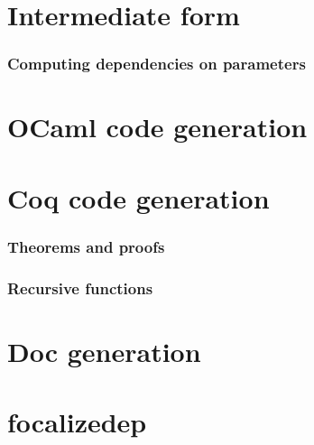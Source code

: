 \documentclass{book}
\begin{document}
\chapter{Intermediate form}
\subsection{Computing dependencies on parameters}

\chapter{OCaml code generation}

\chapter{Coq code generation}
\subsection{Theorems and proofs}
\subsection{Recursive functions}

\chapter{Doc generation}

\chapter{focalizedep}
\end{document}
